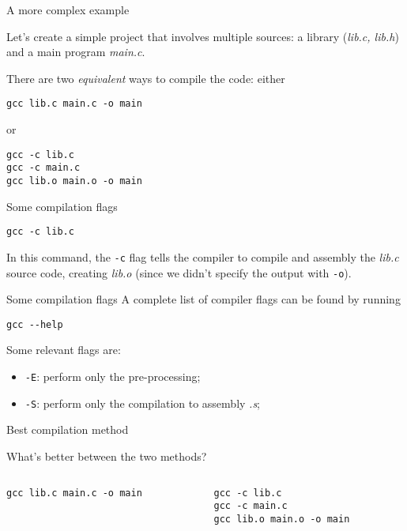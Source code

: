 \begin{frame}[fragile]{A more complex example}

    Let's create a simple project that involves multiple sources: a library (\textit{lib.c, lib.h}) and a main program \textit{main.c}.

    There are two \textit{equivalent} ways to compile the code: either

    \begin{lstlisting}
gcc lib.c main.c -o main \end{lstlisting}
    or
    \begin{lstlisting}
gcc -c lib.c 
gcc -c main.c 
gcc lib.o main.o -o main \end{lstlisting}
\end{frame}

\begin{frame}[fragile]{Some compilation flags}
    \begin{lstlisting}
gcc -c lib.c \end{lstlisting}

    In this command, the \texttt{-c} flag tells the compiler to compile and assembly the \textit{lib.c} source code, creating \textit{lib.o} (since we didn't specify the output with \texttt{-o}).
\end{frame}

\begin{frame}[fragile]{Some compilation flags}
    A complete list of compiler flags can be found by running
    \begin{lstlisting}
gcc --help \end{lstlisting}

    Some relevant flags are:
    \begin{itemize}
        \item \texttt{-E}: perform only the pre-processing;
        \item \texttt{-S}: perform only the compilation to assembly \textit{.s};
    \end{itemize}

\end{frame}

\begin{frame}[fragile]{Best compilation method}

    What's better between the two methods?
    \begin{columns}[c]
      \begin{column}{0.48\textwidth}
        \begin{lstlisting}
gcc lib.c main.c -o main \end{lstlisting}
      \end{column}
      \begin{column}{0.48\textwidth}
        \begin{lstlisting}
gcc -c lib.c 
gcc -c main.c 
gcc lib.o main.o -o main \end{lstlisting}

      \end{column}
    \end{columns}
\end{frame}

